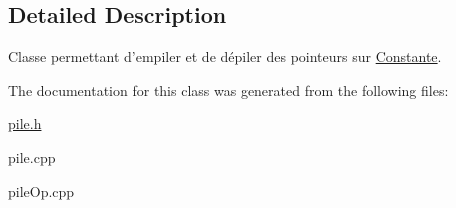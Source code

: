 \subsection{Detailed Description}
Classe permettant d'empiler et de dépiler des pointeurs sur \hyperlink{class_constante}{Constante}. 

The documentation for this class was generated from the following files\-:\begin{DoxyCompactItemize}
\item 
\hyperlink{pile_8h}{pile.\-h}\item 
pile.\-cpp\item 
pile\-Op.\-cpp\end{DoxyCompactItemize}

